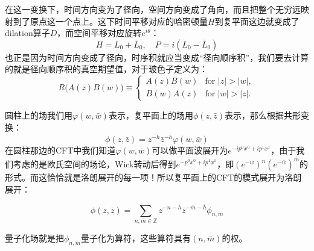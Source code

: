 在这一变换下，时间方向变为了径向，空间方向变成了角向，而且把整个无穷远映射到了原点这一个点上。这下时间平移对应的哈密顿量$H$到复平面这边就变成了dilation算子$D$，而空间平移对应旋转$e^{i\theta}$：
\begin{equation}
		\boxed{H=L_0+\bar {L}_0,\quad P=i\left(L_0-\bar {L}_0\right)}
\end{equation}
也正是因为时间方向变成了径向，时序积就应当变成“径向顺序积”，我们要去计算的就是径向顺序积的真空期望值，对于玻色子定义为：
\begin{equation}
	R\bigl(A(z)B(w)\bigr)\equiv\begin{cases}{}A(z)B(w)&\text{for }|z|>|w|,\\B(w)A(z)&\text{for }|w|>|z|.\end{cases}
\end{equation}

圆柱上的场我们用$\varphi(w,\bar w)$表示，复平面上的场用$\phi(z,\bar z)$表示，那么根据共形变换：
\begin{equation}
	\phi(z,\bar z)=z^{-h}{\bar {z}}^{-\bar h}\varphi(w,\bar w)
\end{equation}
在圆柱那边的CFT中我们知道$\varphi(w,\bar w)$可以做平面波展开为$e^{-ip^0x^0+ip^1x^1}$，由于我们考虑的是欧氏空间的场论，Wick转动后得到$e^{-p^0x^0+ip^1x^1}$，即$(e^{-w})^n(e^{-\bar w})^{\bar m}$的形式。而这恰恰就是洛朗展开的每一项！所以复平面上的CFT的模式展开为洛朗展开：
\begin{theorem}
	\begin{equation}
		\boxed{\phi(z,\overline{z})=\sum_{n,\overline{m}\in\mathbb{Z}}z^{-n-h}\overline{z}^{-\overline{m}-\overline{h}}\phi_{n,\overline{m}}}
	\end{equation}
\end{theorem}
量子化场就是把$\phi_{n,\bar m}$量子化为算符，这些算符具有$(n,\bar m)$的权。

